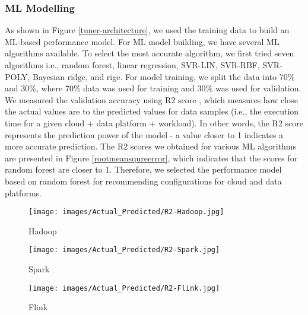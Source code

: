 \documentclass[3p]{elsarticle}
\begin{document}
\subsubsection{ML Modelling} As shown in Figure \ref{tuner-architecture}, we used the training data to build an ML-based performance model. For ML model building, we have several ML algorithms available. To select the most accurate algorithm, we first tried seven algorithms i.e., random forest, linear regression, SVR-LIN, SVR-RBF, SVR-POLY, Bayesian ridge, and rige. For model training, we split the data into 70\% and 30\%, where 70\% data was used for training and 30\% was used for validation. We measured the validation accuracy using R2 score \cite{vidyullatha2016machine}, which measures how close the actual values are to the predicted values for data samples (i.e., the execution time for a given cloud + data platform + workload). In other words, the R2 score represents the prediction power of the model - a value closer to 1 indicates a more accurate prediction. The R2 scores we obtained for various ML algorithms are presented in Figure \ref{rootmeansqureerror}, which indicates that the scores for random forest are closer to 1. Therefore, we selected the performance model based on random forest for recommending configurations for cloud and data platforms. 


\begin{figure*}
\centering
\begin{subfigure}{.30\textwidth}
  \centering
  \texttt{[image: images/Actual\_Predicted/R2-Hadoop.jpg]}
  \caption{Hadoop}
  \label{fig:Flink-Resource-CPU}
\end{subfigure}%
\begin{subfigure}{.30\textwidth}
  \centering
  \texttt{[image: images/Actual\_Predicted/R2-Spark.jpg]}
  \caption{Spark}
  \label{fig:Flink-Resource-Memory}
\end{subfigure}
\begin{subfigure}{.30\textwidth}
  \centering
  \texttt{[image: images/Actual\_Predicted/R2-Flink.jpg]}
  \caption{Flink}
  \label{fig:Flink-Resource-Disk}
\end{subfigure}
\caption{Prediction Accuracy of \textit{TUNER} Performance Model with various machine learning algorithms}
\label{rootmeansqureerror}
\end{figure*}
\end{document}
